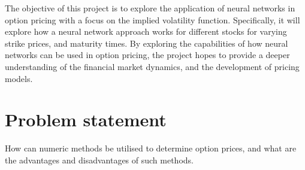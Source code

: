 The objective of this project is to explore the application of neural networks in option pricing with a focus on the implied volatility function. Specifically, it will explore how a neural network approach works for different stocks for varying strike prices, and maturity times. By exploring the capabilities of how neural networks can be used in option pricing, the project hopes to provide a deeper understanding of the financial market dynamics, and the development of pricing models. 


\section{Problem statement}\label{Sec.Problem_statement}
How can numeric methods be utilised to determine option prices, and what are the advantages and disadvantages of such methods.